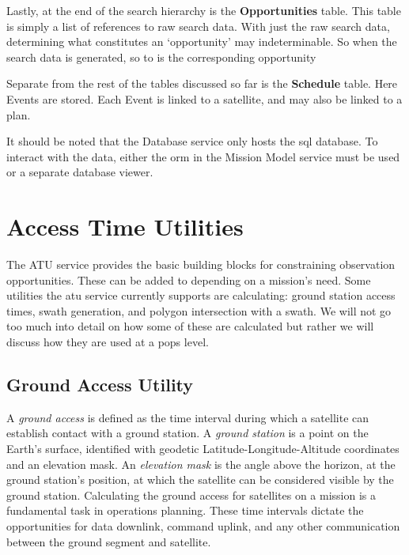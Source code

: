 Lastly, at the end of the search hierarchy is the \textbf{Opportunities} table.
This table is simply a list of references to raw search data. With just the raw
search data, determining what constitutes an `opportunity' may indeterminable.
So when the search data is generated, so to is the corresponding opportunity

Separate from the rest of the tables discussed so far is the \textbf{Schedule}
table. Here Events are stored. Each Event is linked to a satellite, and may
also be linked to a plan.

It should be noted that the Database service only hosts the \gls{sql} database.
To interact with the data, either the \acrshort{orm} in the Mission Model
service must be used or a separate database viewer.




\section{Access Time Utilities}

The ATU service provides the basic building blocks for
constraining observation opportunities. These can be added to depending on a
mission’s need. Some utilities the \gls{atu} service currently supports are
calculating: ground station access times, swath generation, and polygon
intersection with a swath. We will not go too much into detail on how some of
these are calculated but rather we will discuss how they are used at a
\gls{pops} level.

\subsection{Ground Access Utility}

A \textit{ground access} is defined as the time interval during which a
satellite can establish contact with a ground station. A \textit{ground
station} is a point on the Earth’s surface, identified with geodetic
Latitude-Longitude-Altitude coordinates and an elevation mask. An
\textit{elevation mask} is the angle above the horizon, at the ground station’s
position, at which the satellite can be considered visible by the ground
station. Calculating the ground access for satellites on a mission is a
fundamental task in operations planning. These time intervals dictate the
opportunities for data downlink, command uplink, and any other communication
between the ground segment and satellite.

